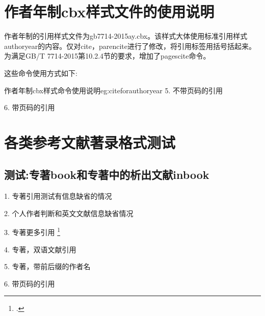 \documentclass[11pt]{article} %
\begin{document}
\section{作者年制cbx样式文件的使用说明}

作者年制的引用样式文件为gb7714-2015ay.cbx。该样式大体使用标准引用样式authoryear的内容。仅对cite，parencite进行了修改，将引用标签用括号括起来。为满足GB/T 7714-2015第10.2.4节的要求，增加了pagescite命令。

这些命令使用方式如下:

\begin{codetex}{作者年制cbx样式命令使用说明}{eg:citeforauthoryear}
5. 不带页码的引用\cite{Peebles2001-100-100}\parencite{Miroslav2004--}

6. 带页码的引用\cite[见][49页]{蔡敏2006--}\parencite[见][49页]{Miroslav2004--}
\end{codetex}

\section{各类参考文献著录格式测试}
\subsection{测试:专著book和专著中的析出文献inbook}\label{sec:test:book}

\begin{refsection}
1. 专著引用测试有信息缺省的情况
\cite{余敏2001-179-193,余敏2001-179-193a,余敏2001-179-193b,booknoauthor,booknodate,booknolocation,booknopublisher,booknopages, 余敏2001-179-193c}

2. 个人作者判断和英文文献信息缺省情况
\cite{Parsons2000a--,Parsons2000b--,Parsons2000noloc--,Parsons2000nopub--,Parsons2000--,Parsons2000nodate--,Parsons2000noauthor--}

3. 专著更多引用
\cite{GPS1988--}\cite{顾炎武1982--}\cite{赵耀东1998--}\cite{PIGGOT1990--}\cite{PEEBLES2001--}\cite{王夫之1845--}
\cite{Poisel2013--}\cite{张伯伟2002--}\cite{2009-155-155}\footcite{赵学功2001--}\cite{Simon2001--}

4. 专著，双语文献引用\cite{bilangyi2013}

5. 专著，带前后缀的作者名\cite{Peebles2001-100-100}

6. 带页码的引用
\parencite[见][49页]{Miroslav2004--}\cite[见][49页]{蔡敏2006--}



\printbibliography[heading=bibliography,title=【专著】]
\end{refsection}
\end{document}
